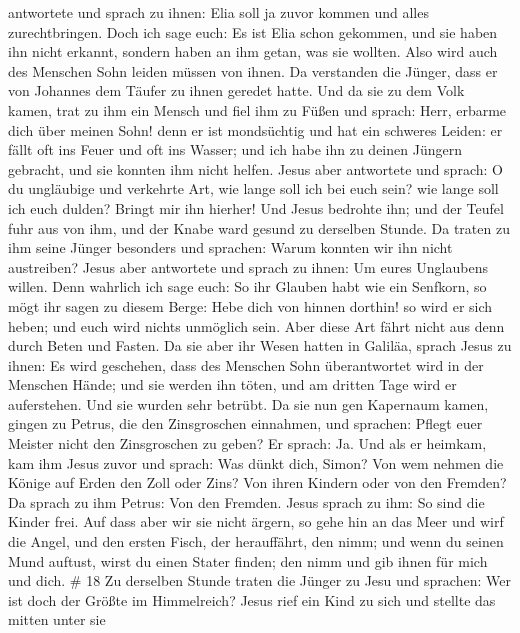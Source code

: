 antwortete und sprach zu ihnen: Elia soll ja zuvor kommen und alles
zurechtbringen.  Doch ich sage euch: Es ist Elia schon
gekommen, und sie haben ihn nicht erkannt, sondern haben an ihm getan,
was sie wollten. Also wird auch des Menschen Sohn leiden müssen von
ihnen.  Da verstanden die Jünger, dass er von Johannes dem
Täufer zu ihnen geredet hatte.  Und da sie zu dem Volk
kamen, trat zu ihm ein Mensch und fiel ihm zu Füßen  und
sprach: Herr, erbarme dich über meinen Sohn! denn er ist mondsüchtig und
hat ein schweres Leiden: er fällt oft ins Feuer und oft ins Wasser;
 und ich habe ihn zu deinen Jüngern gebracht, und sie
konnten ihm nicht helfen.  Jesus aber antwortete und
sprach: O du ungläubige und verkehrte Art, wie lange soll ich bei euch
sein? wie lange soll ich euch dulden? Bringt mir ihn hierher!
 Und Jesus bedrohte ihn; und der Teufel fuhr aus von ihm,
und der Knabe ward gesund zu derselben Stunde.  Da traten
zu ihm seine Jünger besonders und sprachen: Warum konnten wir ihn nicht
austreiben?  Jesus aber antwortete und sprach zu ihnen: Um
eures Unglaubens willen. Denn wahrlich ich sage euch: So ihr Glauben
habt wie ein Senfkorn, so mögt ihr sagen zu diesem Berge: Hebe dich von
hinnen dorthin! so wird er sich heben; und euch wird nichts unmöglich
sein.  Aber diese Art fährt nicht aus denn durch Beten und
Fasten.  Da sie aber ihr Wesen hatten in Galiläa, sprach
Jesus zu ihnen: Es wird geschehen, dass des Menschen Sohn überantwortet
wird in der Menschen Hände;  und sie werden ihn töten, und
am dritten Tage wird er auferstehen. Und sie wurden sehr betrübt.
 Da sie nun gen Kapernaum kamen, gingen zu Petrus, die den
Zinsgroschen einnahmen, und sprachen: Pflegt euer Meister nicht den
Zinsgroschen zu geben?  Er sprach: Ja. Und als er heimkam,
kam ihm Jesus zuvor und sprach: Was dünkt dich, Simon? Von wem nehmen
die Könige auf Erden den Zoll oder Zins? Von ihren Kindern oder von den
Fremden?  Da sprach zu ihm Petrus: Von den Fremden. Jesus
sprach zu ihm: So sind die Kinder frei.  Auf dass aber wir
sie nicht ärgern, so gehe hin an das Meer und wirf die Angel, und den
ersten Fisch, der herauffährt, den nimm; und wenn du seinen Mund
auftust, wirst du einen Stater finden; den nimm und gib ihnen für mich
und dich. \# 18  Zu derselben Stunde traten die Jünger zu
Jesu und sprachen: Wer ist doch der Größte im Himmelreich? 
Jesus rief ein Kind zu sich und stellte das mitten unter sie
